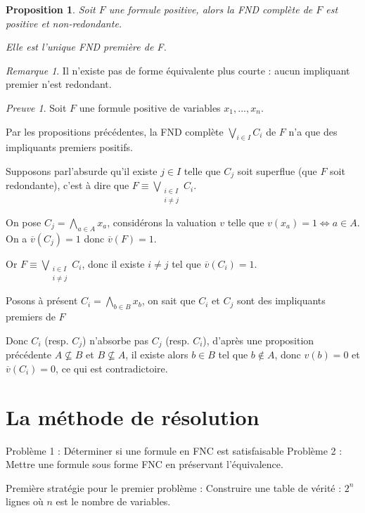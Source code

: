 \documentclass[]{article}
\newtheorem{myproposition}{Proposition}
\theoremstyle{remark}
\newtheorem{myrem}{Remarque}
\newtheorem{myproof}{Preuve}
\theoremstyle{definition}
\begin{document}
\begin{myproposition}
	Soit $F$ une formule positive, alors la FND complète de $F$ est positive et non-redondante.
	
	Elle est l'unique FND première de F.
\end{myproposition}

\begin{myrem}
	Il n'existe pas de forme équivalente plus courte : aucun impliquant premier n'est redondant.
\end{myrem}

\begin{myproof}
	Soit $F$ une formule positive de variables $x_1, ..., x_n$.
	
	Par les propositions précédentes, la FND complète $\displaystyle \bigvee_{i \in I} C_i$ de $F$ n'a que des impliquants premiers positifs.
	
	Supposons parl'absurde qu'il existe $j \in I$ telle que $C_j$ soit superflue (que $F$ soit redondante), c'est à dire que $\displaystyle F \equiv \bigvee_{\substack{i \in I \\ i \neq j}} C_i$.
	
	On pose $\displaystyle C_j = \bigwedge_{a \in A} x_a$, considérons la valuation $v$ telle que $v(x_a) = 1 \Longleftrightarrow a \in A$. On a $\overline{v}(C_j) = 1$ donc $\overline{v}(F)=1$.
	
	Or $\displaystyle F \equiv \bigvee_{\substack{i \in I \\ i \neq j}} C_i$, donc il existe $i \neq j$ tel que $\overline{v}(C_i) = 1$.
	
	Posons à présent $\displaystyle C_i = \bigwedge_{b \in B} x_b$, on sait que $C_i$ et $C_j$ sont des impliquants premiers de $F$
	
	Donc $C_i$ (resp. $C_j$) n'absorbe pas $C_j$ (resp. $C_i$), d'après une proposition précédente $A \not\subseteq B$ et $B \not\subseteq A$, il existe alors $b \in B$ tel que $b \notin A$, donc $v(b) = 0$ et $\overline{v}(C_i)=0$, ce qui est contradictoire.
\end{myproof}

\part{La méthode de résolution}

Problème 1 : Déterminer si une formule en FNC est satisfaisable
Problème 2 : Mettre une formule sous forme FNC en préservant l'équivalence.

Première stratégie pour le premier problème : Construire une table de vérité : $2^n$ lignes où $n$ est le nombre de variables.
\end{document}
